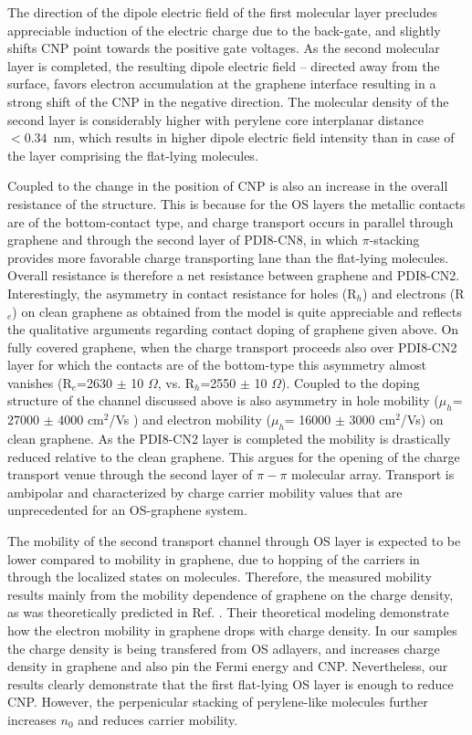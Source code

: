 \documentclass[review]{elsarticle}
\begin{document}
  The direction of the dipole electric field of the first molecular layer precludes appreciable induction of the electric charge due to the back-gate, and slightly shifts CNP point towards the positive gate voltages.
 As the second molecular layer is completed, the resulting dipole electric field -- directed away from the surface, favors electron accumulation at the graphene interface resulting in a strong shift of the CNP in the negative direction.
  The molecular density of the second layer is considerably higher with perylene core interplanar distance  $< 0.34$~nm, which results in higher dipole electric field intensity than in  case of the layer comprising the flat-lying molecules.


Coupled to the change in the position of CNP is also an increase in the overall resistance of the structure.
 This is because for the OS layers the metallic contacts are of the  bottom-contact type, and charge transport occurs in parallel through graphene and through the second layer of PDI8-CN8, in which $\pi$-stacking provides more favorable charge transporting lane than the flat-lying molecules.
 Overall resistance is therefore a net resistance between graphene and PDI8-CN2.
 Interestingly, the asymmetry in contact resistance for holes (R$_{h}$) and  electrons  (R$_{e}$) on clean graphene as obtained from the model is quite appreciable and reflects the qualitative arguments regarding contact doping of graphene given above.
  On fully covered graphene, when the charge transport proceeds also over PDI8-CN2 layer for which the contacts are of the bottom-type this asymmetry almost vanishes (R$_{e}$=2630 $\pm$ 10 $\Omega$, vs. R$_{h}$=2550 $\pm$ 10 $\Omega$).
  Coupled to the doping structure of the channel discussed above is also asymmetry in hole mobility  ($\mu_{h}$= 27000 $\pm$ 4000 cm$^{2}$/Vs ) and electron mobility ($\mu_{h}$= 16000 $\pm$ 3000 cm$^{2}$/Vs) on clean graphene.
 As the PDI8-CN2 layer is completed the mobility is drastically reduced relative to the clean graphene.
  This argues for the opening of the charge transport venue through the second layer of $\pi-\pi$ molecular array.
 Transport is ambipolar and characterized by charge carrier mobility values that are unprecedented for an OS-graphene system.

 The mobility of the second transport channel through OS layer is expected to be lower compared
 to mobility in graphene, due to  hopping of the carriers in through the localized states on molecules. 
 Therefore,  the measured mobility  results mainly from the mobility dependence of graphene on the
 charge density, as was theoretically predicted in Ref. \cite{majorana-2016}.
 Their theoretical modeling demonstrate how the electron mobility in graphene drops with charge density.
 In our samples the charge density is being transfered from OS adlayers, and  increases charge density in graphene and also pin the Fermi energy and CNP.
 Nevertheless, our results clearly demonstrate that the first flat-lying OS layer is enough to reduce CNP.
 However, the perpenicular stacking of perylene-like molecules further increases $n_0$ and reduces carrier mobility. 
\end{document}
